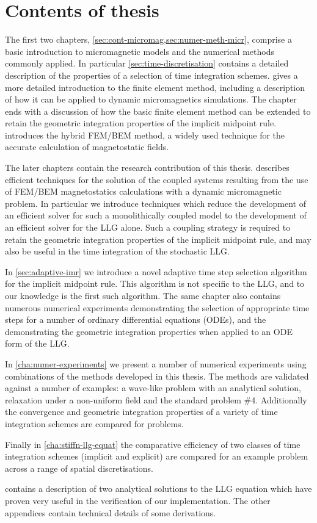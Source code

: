 \section{Contents of thesis}

The first two chapters, \cref{sec:cont-micromag,sec:numer-meth-micr}, comprise a basic introduction to micromagnetic models and the numerical methods commonly applied.
In particular \cref{sec:time-discretisation} contains a detailed description of the properties of a selection of time integration schemes.
 gives a more detailed introduction to the finite element method, including a description of how it can be applied to dynamic micromagnetics simulations.
The chapter ends with a discussion of how the basic finite element method can be extended to retain the geometric integration properties of the implicit midpoint rule.
 introduces the hybrid FEM/BEM method, a widely used technique for the accurate calculation of magnetostatic fields.

The later chapters contain the research contribution of this thesis.
 describes efficient techniques for the solution of the coupled systems resulting from the use of FEM/BEM magnetostatics calculations with a dynamic micromagnetic problem.
In particular we introduce techniques which reduce the development of an efficient solver for such a monolithically coupled model to the development of an efficient solver for the LLG alone.
Such a coupling strategy is required to retain the geometric integration properties of the implicit midpoint rule, and may also be useful in the time integration of the stochastic LLG.

In \cref{sec:adaptive-imr} we introduce a novel adaptive time step selection algorithm for the implicit midpoint rule.
This algorithm is not specific to the LLG, and to our knowledge is the first such algorithm.
The same chapter also contains numerous numerical experiments demonstrating the selection of appropriate time steps for a number of ordinary differential equations (ODEs), and the demonstrating the geometric integration properties when applied to an ODE form of the LLG.

In \cref{cha:numer-experiments} we present a number of numerical experiments using combinations of the methods developed in this thesis.
The methods are validated against a number of examples: a wave-like problem with an analytical solution, relaxation under a non-uniform field and the \mumag standard problem \#4.
Additionally the convergence and geometric integration properties of a variety of time integration schemes are compared for problems.

Finally in \cref{cha:stiffn-llg-equat} the comparative efficiency of two classes of time integration schemes (implicit and explicit) are compared for an example problem across a range of spatial discretisations.

 contains a description of two analytical solutions to the LLG equation which have proven very useful in the verification of our implementation.
The other appendices contain technical details of some derivations.


